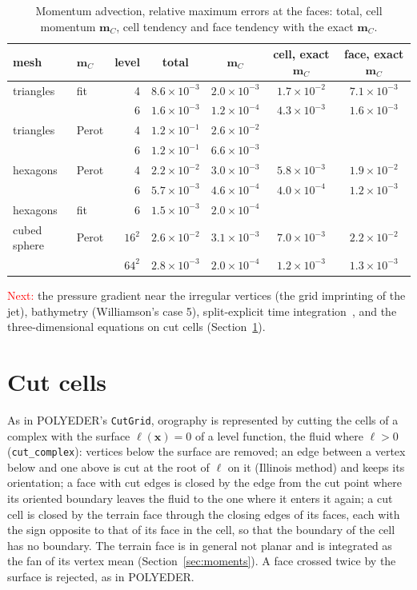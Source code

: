 \documentclass[preprint,12pt]{elsarticle}
\newcommand{\bx}{\mathbf{x}}
\newcommand{\code}[1]{\texttt{#1}}
\theoremstyle{definition}
\begin{document}
\begin{table}[h]
\centering
\caption{Momentum advection, relative maximum errors at the faces: total, cell momentum $\mathbf m_C$,
cell tendency and face tendency with the exact $\mathbf m_C$.}
\label{tab:advection}
\begin{tabular}{llrcccc}
\toprule
mesh & $\mathbf m_C$ & level & total & $\mathbf m_C$ & cell, exact $\mathbf m_C$ & face, exact $\mathbf m_C$ \\
\midrule
triangles & fit & 4 & $8.6\times10^{-3}$ & $2.0\times10^{-3}$ & $1.7\times10^{-2}$ & $7.1\times10^{-3}$ \\
 & & 6 & $1.6\times10^{-3}$ & $1.2\times10^{-4}$ & $4.3\times10^{-3}$ & $1.6\times10^{-3}$ \\
triangles & Perot & 4 & $1.2\times10^{-1}$ & $2.6\times10^{-2}$ & & \\
 & & 6 & $1.2\times10^{-1}$ & $6.6\times10^{-3}$ & & \\
hexagons & Perot & 4 & $2.2\times10^{-2}$ & $3.0\times10^{-3}$ & $5.8\times10^{-3}$ & $1.9\times10^{-2}$ \\
 & & 6 & $5.7\times10^{-3}$ & $4.6\times10^{-4}$ & $4.0\times10^{-4}$ & $1.2\times10^{-3}$ \\
hexagons & fit & 6 & $1.5\times10^{-3}$ & $2.0\times10^{-4}$ & & \\
cubed sphere & Perot & $16^2$ & $2.6\times10^{-2}$ & $3.1\times10^{-3}$ & $7.0\times10^{-3}$ & $2.2\times10^{-2}$ \\
 & & $64^2$ & $2.8\times10^{-3}$ & $2.0\times10^{-4}$ & $1.2\times10^{-3}$ & $1.3\times10^{-3}$ \\
\bottomrule
\end{tabular}
\end{table}

\textcolor{red}{Next:} the pressure gradient near the irregular vertices (the grid imprinting of the
jet), bathymetry (Williamson's case 5), split-explicit time integration~\cite{Wensch2009}, and the
three-dimensional equations on cut cells (Section~\ref{sec:cut}).

\section{Cut cells}\label{sec:cut}

As in POLYEDER's \code{CutGrid}, orography is represented by cutting the cells of a complex with the
surface $\ell(\bx)=0$ of a level function, the fluid where $\ell>0$ (\code{cut\_complex}): vertices
below the surface are removed; an edge between a vertex below and one above is cut at the root of
$\ell$ on it (Illinois method) and keeps its orientation; a face with cut edges is closed by the edge
from the cut point where its oriented boundary leaves the fluid to the one where it enters it again;
a cut cell is closed by the terrain face through the closing edges of its faces, each with the sign
opposite to that of its face in the cell, so that the boundary of the cell has no boundary. The
terrain face is in general not planar and is integrated as the fan of its vertex mean
(Section~\ref{sec:moments}). A face crossed twice by the surface is rejected, as in POLYEDER.
\end{document}
